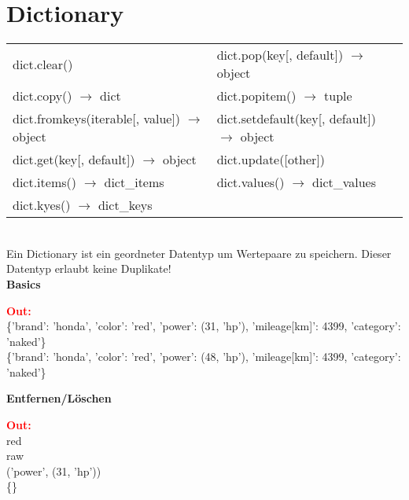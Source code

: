 \section*{Dictionary}
\hspace{2cm}
\begin{tabular}{|l l|}
	\hline dict.clear() & dict.pop(key[, default]) $\to$ object
	\\ dict.copy() $\to$ dict & dict.popitem() $\to$ tuple
	\\ dict.fromkeys(iterable[, value]) $\to$ object & dict.setdefault(key[, default]) $\to$ object
	\\ dict.get(key[, default]) $\to$ object & dict.update([other])
	\\ dict.items() $\to$ dict\_items & dict.values() $\to$ dict\_values
	\\ dict.kyes() $\to$ dict\_keys &
	\\\hline
\end{tabular}
\\
Ein Dictionary ist ein geordneter Datentyp um Wertepaare zu speichern. Dieser Datentyp erlaubt keine Duplikate!
\vspace{0.5cm}
\\\vspace{0.1cm}
\textbf{Basics}
\\
\begin{minipage}[h]{10cm}
	
\end{minipage}
\begin{minipage}[h]{8cm}
	\textcolor{red}{\textbf{Out:}} \\
	\{'brand': 'honda', 'color': 'red', 'power': (31, 'hp'), 'mileage[km]': 4399, 'category': 'naked'\}
	\\\{'brand': 'honda', 'color': 'red', 'power': (48, 'hp'), 'mileage[km]': 4399, 'category': 'naked'\}
\end{minipage}
\newpage
\hspace{-0.5cm}
\textbf{Entfernen/Löschen}
\\
\begin{minipage}[h]{10cm}
	
\end{minipage}
\begin{minipage}[h]{8cm}
	\textcolor{red}{\textbf{Out:}}
	\\red
	\\raw
	\\('power', (31, 'hp'))
	\\\{\}
\end{minipage}

